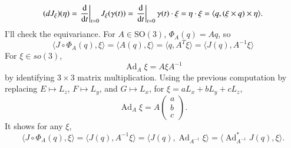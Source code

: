 \documentclass[a4paper, 12pt]{article}
\theoremstyle{Mydefinition}
\theoremstyle{Mytheorem}
\DeclareMathOperator{\Ad}{Ad}
\begin{document}
\begin{enumerate}
    \begin{equation*}
    \begin{split}
        (dJ_\xi)(\eta) = \left.\dv{t}\right|_{t=0}J_\xi(\gamma(t)) = \left.\dv{t}\right|_{t=0}\gamma(t)\cdot \xi = \eta\cdot \xi = \langle q, (\xi\times q)\times \eta\rangle.
    \end{split}
    \end{equation*}
    I'll check the equivariance. For $A\in \mathrm{SO}(3)$, $\Phi_A(q) = Aq$, so
    \begin{equation*}
        \langle J\circ \Phi_A(q), \xi\rangle  = \langle A(q), \xi\rangle = \langle q, A^T\xi\rangle = \langle J(q), A^{-1}\xi\rangle
    \end{equation*}
    For $\xi\in \mathit{so}(3)$, 
    \begin{equation*}
        \Ad_{A}\xi = A\xi A^{-1}
    \end{equation*}
    by identifying $3\times 3$ matrix multiplication. Using the previous computation by replacing $E\mapsto L_z$, $F\mapsto L_y$, and $G\mapsto L_x$, for $\xi = aL_x+bL_y+cL_z$,
    \begin{equation*}
        \Ad_{A}\xi = A\begin{pmatrix}
            a\\b\\c
        \end{pmatrix}.
    \end{equation*}
    It shows for any $\xi$,
\begin{equation*}
    \langle J\circ \Phi_A(q), \xi\rangle  = \langle J(q), A^{-1}\xi\rangle = \langle J(q), \Ad_{A^{-1}}\xi\rangle = \langle \Ad_{A^{-1}}^*J(q), \xi\rangle.
\end{equation*}
\end{enumerate}
\end{document}
